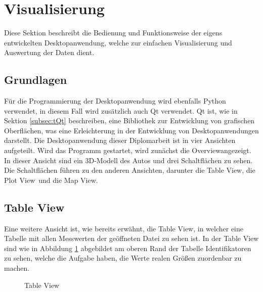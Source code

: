 \section{Visualisierung}
\label{sec:DesktopApp}
Diese Sektion beschreibt die Bedienung und Funktionsweise der eigens entwickelten Desktopanwendung, welche zur einfachen Visualisierung und Auswertung der Daten dient.
\subsection{Grundlagen}
\label{subsec:VisGrundlagen}
Für die Programmierung der Desktopanwendung wird ebenfalls Python verwendet, in diesem Fall wird zusätzlich auch Qt verwendet. Qt ist, wie in Sektion \ref{subsec:tQt} beschreiben, eine Bibliothek zur Entwicklung von grafischen Oberflächen, was eine Erleichterung in der Entwicklung von Desktopanwendungen darstellt. Die Desktopanwendung dieser Diplomarbeit ist in vier Ansichten aufgeteilt. Wird das Programm gestartet, wird zunächst die \glqq Overview\grqq angezeigt. In dieser Ansicht sind ein \ac{3D}-Modell des Autos und drei Schaltflächen zu sehen. Die Schaltflächen führen zu den anderen Ansichten, darunter die \glqq Table View\grqq , die \glqq Plot View\grqq \ und die \glqq Map View\grqq .
\subsection{Table View}
\label{subsec:VisTableView}
Eine weitere Ansicht ist, wie bereits erwähnt, die \glqq Table View\grqq , in welcher eine Tabelle mit allen Messwerten der geöffneten Datei zu sehen ist. In der Table View sind wie in Abbildung \ref{fig:TableView} abgebildet am oberen Rand der Tabelle Identifikatoren zu sehen, welche die Aufgabe haben, die Werte realen Größen zuordenbar zu machen.
\begin{figure}[h]
\centering
\missingfigure{}
\caption{Table View}
\label{fig:TableView}
\end{figure}

